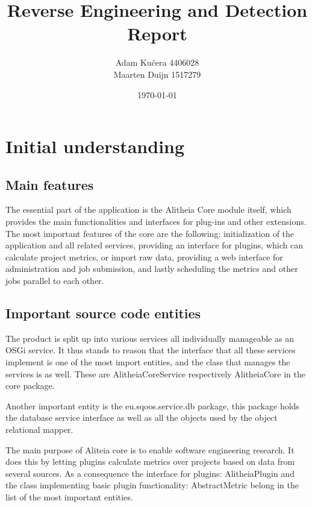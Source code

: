 \documentclass[a4paper,11pt,titlepage]{article}
\author{Adam Ku\v{c}era 4406028\\Maarten Duijn 1517279}
\title{Reverse Engineering and Detection Report}
\date{\today}
\begin{document}
\maketitle

\section{Initial understanding}
\subsection{Main features}
The essential part of the application is the Alitheia Core module itself, which provides the main functionalities and interfaces for plug-ins and other extensions. The most important features of the core are the following: initialization of the application and all related services, providing an interface for plugins, which can calculate project metrics, or import raw data, providing a web interface for administration and job submission, and lastly scheduling the metrics and other jobs parallel to each other.

%

\subsection{Important source code entities}
The product is split up into various services all individually manageable as an OSGi service. It thus stands to reason that the interface that all these services implement is one of the most import entities, and the class that manages the services is as well. These are AlitheiaCoreService respectively AlitheiaCore in the core package.

Another important entity is the eu.sqoos.service.db package, this package holds the database service interface as well as all the objects used by the object relational mapper.

The main purpose of Aliteia core is to enable software engineering research. It does this by letting plugins calculate metrics over projects based on data from several sources. As a consequence the interface for plugins: AlitheiaPlugin and the class implementing basic plugin functionality: AbstractMetric belong in the list of the most important entities.
\end{document}
